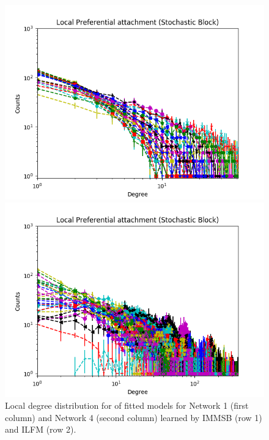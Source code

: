 \begin{figure}[h]
\begin{minipage}{0.24\textwidth}
            \includegraphics[width=\textwidth]{img/corpus/immsb_network4_1}
        \end{minipage}
        \begin{minipage}{0.24\textwidth}
            \includegraphics[width=\textwidth]{img/corpus/ilfm_network4_1}
        \end{minipage}
        \caption {Local degree distribution for of fitted models for Network 1 (first column) and Network 4 (second column) learned by IMMSB (row 1) and ILFM (row 2).} 
	\label{fig:me_local}
\end{figure}


